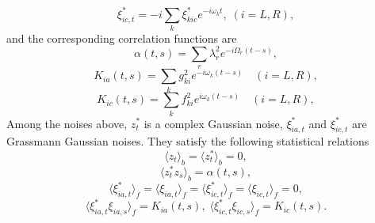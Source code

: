 \documentclass[preprint]{elsarticle}
\begin{document}
\begin{equation}
\xi_{ic,t}^{*}=-i\sum_{k}\xi_{kic}^{*}e^{-i\omega_{k}t},\;(i=L,R),
\end{equation}
and the corresponding correlation functions are
\begin{equation}
\alpha(t,s)=\sum_{r}\lambda_{r}^{2}e^{-i\Omega_{r}(t-s)},
\end{equation}
\begin{equation}
K_{ia}(t,s)=\sum_{k}g_{ki}^{2}e^{-i\omega_{k}(t-s)}\quad(i=L,R),
\end{equation}
\begin{equation}
K_{ic}(t,s)=\sum_{k}f_{ki}^{2}e^{i\omega_{k}(t-s)}\quad(i=L,R),
\end{equation}
Among the noises above, $z_{t}^{*}$ is a complex Gaussian noise,
$\xi_{ia,t}^{*}$ and $\xi_{ic,t}^{*}$ are Grassmann Gaussian noises.
They satisfy the following statistical relations
\begin{equation}
\langle z_{t}\rangle_{b}=\langle z_{t}^{*}\rangle_{b}=0,
\end{equation}
\begin{equation}
\langle z_{t}^{*}z_{s}\rangle_{b}=\alpha(t,s),
\end{equation}
\begin{equation}
\langle\xi_{ia,t}^{*}\rangle_{f}=\langle\xi_{ia,t}\rangle_{f}=\langle\xi_{ic,t}^{*}\rangle_{f}=\langle\xi_{ic,t}\rangle_{f}=0,
\end{equation}
\begin{equation}
\langle\xi_{ia,t}^{*}\xi_{ia,s}\rangle_{f}=K_{ia}(t,s),\;\langle\xi_{ic,t}^{*}\xi_{ic,s}\rangle_{f}=K_{ic}(t,s).
\end{equation}
\end{document}
